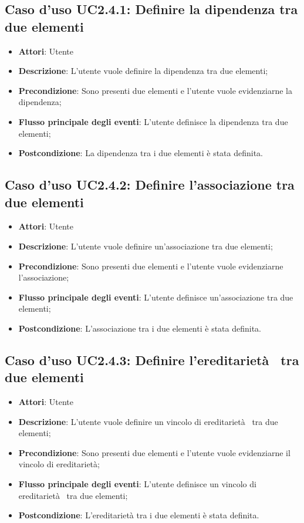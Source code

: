 \documentclass[../AnalisiDeiRequisiti.tex]{subfiles}
\begin{document}
		\subsection{Caso d'uso UC2.4.1: Definire la dipendenza tra due elementi}
		\begin{itemize}
			\item \textbf{Attori}: Utente
			\item \textbf{Descrizione}: L'utente vuole definire la dipendenza tra due elementi;
			\item \textbf{Precondizione}: Sono presenti due elementi e l'utente vuole evidenziarne la dipendenza;
			\item \textbf{Flusso principale degli eventi}: L'utente definisce la dipendenza tra due elementi;
			\item \textbf{Postcondizione}: La dipendenza tra i due elementi è stata definita.
		\end{itemize}
		\subsection{Caso d'uso UC2.4.2: Definire l'associazione tra due elementi}
		\begin{itemize}
			\item \textbf{Attori}: Utente
			\item \textbf{Descrizione}: L'utente vuole definire un'associazione tra due elementi;
			\item \textbf{Precondizione}: Sono presenti due elementi e l'utente vuole evidenziarne l'associazione;
			\item \textbf{Flusso principale degli eventi}: L'utente definisce un'associazione tra due elementi;
			\item \textbf{Postcondizione}: L'associazione tra i due elementi è stata definita.
		\end{itemize}
		\subsection{Caso d'uso UC2.4.3: Definire l'ereditarietà  tra due elementi}
		\begin{itemize}
			\item \textbf{Attori}: Utente
			\item \textbf{Descrizione}: L'utente vuole definire un vincolo di ereditarietà  tra due elementi;
			\item \textbf{Precondizione}: Sono presenti due elementi e l'utente vuole evidenziarne il vincolo di ereditarietà;
			\item \textbf{Flusso principale degli eventi}: L'utente definisce un vincolo di ereditarietà  tra due elementi;
			\item \textbf{Postcondizione}: L'ereditarietà tra i due elementi è stata definita.
		\end{itemize}
\end{document}

